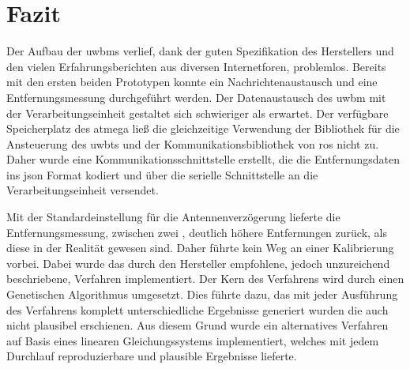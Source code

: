 %
%
%		
%
\section{Fazit}

Der Aufbau der \glspl{uwbm} verlief, dank der guten Spezifikation des Herstellers und den vielen Erfahrungsberichten aus diversen Internetforen, problemlos. Bereits mit den ersten beiden Prototypen konnte ein Nachrichtenaustausch und eine Entfernungsmessung durchgeführt werden. Der Datenaustausch des \gls{uwbm} mit der Verarbeitungseinheit gestaltet sich schwieriger als erwartet. Der verfügbare Speicherplatz des \gls{atmega} ließ die gleichzeitige Verwendung der Bibliothek für die Ansteuerung des \gls{uwbt}s und der Kommunikationsbibliothek von \gls{ros} nicht zu. Daher wurde eine Kommunikationsschnittstelle erstellt, die die Entfernungsdaten ins \gls{json} Format kodiert und über die serielle Schnittstelle an die Verarbeitungseinheit versendet.

Mit der Standardeinstellung für die Antennenverzögerung lieferte die Entfernungsmessung, zwischen zwei , deutlich höhere Entfernungen zurück, als diese in der Realität gewesen sind. Daher führte kein Weg an einer Kalibrierung vorbei. Dabei wurde das durch den Hersteller empfohlene, jedoch unzureichend beschriebene, Verfahren implementiert. Der Kern des Verfahrens wird durch einen Genetischen Algorithmus umgesetzt. Dies führte dazu, das mit jeder Ausführung des Verfahrens komplett unterschiedliche Ergebnisse generiert wurden die auch nicht plausibel erschienen. Aus diesem Grund wurde ein alternatives Verfahren auf Basis eines linearen Gleichungssystems implementiert, welches mit jedem Durchlauf reproduzierbare und plausible Ergebnisse lieferte.

